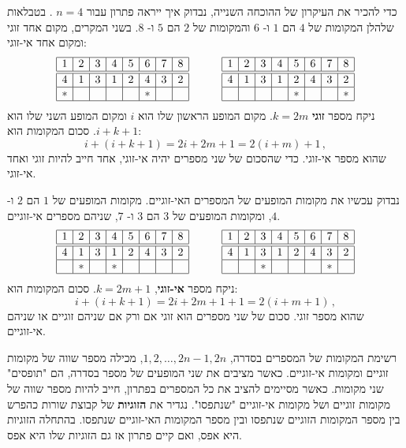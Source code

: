 כדי להכיר את העיקרון של ההוכחה השנייה, נבדוק איך ייראה פתרון עבור
$n=4$
. בטבלאות שלהלן המקומות של 
$4$
הם 
$1$
ו-%
$6$
והמקומות של
$2$
הם
$5$
ו-%
$8$.
בשני המקרים, מקום אחד זוגי ומקום אחד אי-זוגי:
\[
\begin{array}{|c|c|c|c|c|c|c|c|}
\hline
1&2&3&4&5&6&7&8\\
\hline\hline
4&1&3&1&2&4&3&2\\\hline
*&&&&&*&&\\\hline
\end{array}
\hspace{3em}
\begin{array}{|c|c|c|c|c|c|c|c|}
\hline
1&2&3&4&5&6&7&8\\
\hline\hline
4&1&3&1&2&4&3&2\\\hline
&&&&*&&&*\\\hline
\end{array}
\]
ניקח מספר
\textbf{זוגי}
$k=2m$. 
מקום המופע הראשון שלו הוא
$i$
ומקום המופע השני שלו הוא
$i+k+1$.
סכום המקומות הוא:
\[
i+(i+k+1)=2i+2m+1=2(i+m)+1\,,
\]
שהוא מספר אי-זוגי. כדי שהסכום של שני מספרים יהיה אי-זוגי, אחד חייב להיות זוגי ואחד אי-זוגי.

נבדוק עכשיו את מקומות המופעים של המספרים האי-זוגיים. מקומות המופעים של
$1$
הם
$2$
ו-%
$4$,
ומקומות המופעים של
$3$
הם
$3$
ו-%
$7$,
שניהם מספרים אי-זוגיים.
\[
\begin{array}{|c|c|c|c|c|c|c|c|}
\hline
1&2&3&4&5&6&7&8\\
\hline\hline
4&1&3&1&2&4&3&2\\\hline
&*&&*&&&&\\\hline
\end{array}
\hspace{3em}
\begin{array}{|c|c|c|c|c|c|c|c|}
\hline
1&2&3&4&5&6&7&8\\
\hline\hline
4&1&3&1&2&4&3&2\\\hline
&&*&&&&*&\\\hline
\end{array}
\]
ניקח מספר 
\textbf{אי-זוגי},
$k=2m+1$.
סכום המקומות הוא:
\[
i+(i+k+1)=2i+2m+1+1=2(i+m+1)\,,
\]
שהוא מספר זוגי. סכום של שני מספרים הוא זוגי אם ורק אם שניהם זוגיים או שניהם אי-זוגיים.

רשימת המקומות של המספרים בסדרה,
$1,2,\ldots,2n-1,2n$,
מכילה מספר שווה של מקומות זוגיים ומקומות אי-זוגיים. כאשר מציבים את שני המופעים של מספר בסדרה, הם "תופסים" שני מקומות. כאשר מסיימים להציב את כל המספרים בפתרון, חייב להיות מספר שווה של מקומות זוגיים ושל מקומות אי-זוגיים "שנתפסו". נגדיר את 
\textbf{הזוגיות}
של קבוצת שורות כהפרש בין מספר המקומות הזוגיים שנתפסו ובין מספר המקומות האי-זוגיים שנתפסו. בהתחלה הזוגיות היא אפס, ואם קיים פתרון אז גם הזוגיות שלו היא אפס.


